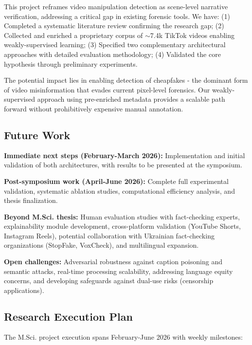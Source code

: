\documentclass[runningheads]{llncs}
\begin{document}
This project reframes video manipulation detection as scene-level narrative verification, addressing a critical gap in existing forensic tools. We have: (1) Completed a systematic literature review confirming the research gap; (2) Collected and enriched a proprietary corpus of $\sim$7.4k TikTok videos enabling weakly-supervised learning; (3) Specified two complementary architectural approaches with detailed evaluation methodology; (4) Validated the core hypothesis through preliminary experiments.

The potential impact lies in enabling detection of cheapfakes - the dominant form of video misinformation that evades current pixel-level forensics. Our weakly-supervised approach using pre-enriched metadata provides a scalable path forward without prohibitively expensive manual annotation.

\subsection{Future Work}

\textbf{Immediate next steps (February-March 2026):} Implementation and initial validation of both architectures, with results to be presented at the symposium.

\textbf{Post-symposium work (April-June 2026):} Complete full experimental validation, systematic ablation studies, computational efficiency analysis, and thesis finalization.

\textbf{Beyond M.Sci. thesis:} Human evaluation studies with fact-checking experts, explainability module development, cross-platform validation (YouTube Shorts, Instagram Reels), potential collaboration with Ukrainian fact-checking organizations (StopFake, VoxCheck), and multilingual expansion.

\textbf{Open challenges:} Adversarial robustness against caption poisoning and semantic attacks, real-time processing scalability, addressing language equity concerns, and developing safeguards against dual-use risks (censorship applications).

\subsection{Research Execution Plan}

The M.Sci. project execution spans February-June 2026 with weekly milestones:
\end{document}

